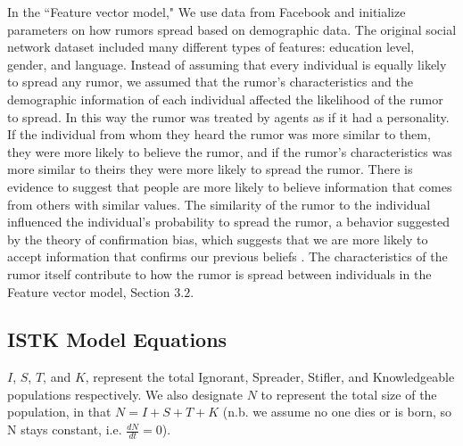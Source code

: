  In the ``Feature vector model," We use data from Facebook and initialize parameters on how rumors spread based on demographic data. The original social network dataset included many different types of features: education level, gender, and language. Instead of assuming that every individual is equally likely to spread any rumor, we assumed that the rumor's characteristics and the demographic information of each individual affected the likelihood of the rumor to spread. In this way the rumor was treated by agents as if it had a personality. If the individual from whom they heard the rumor was more similar to them, they were more likely to believe the rumor, and if the rumor's characteristics was more similar to theirs they were more likely to spread the rumor. There is evidence to suggest that people are more likely to believe information that comes from others with similar values\cite{gillespie-2004}. The similarity of the rumor to the individual influenced the individual's probability to spread the rumor, a behavior suggested by the theory of confirmation bias, which suggests that we are more likely to accept information that confirms our previous beliefs \cite{wason-1960}. The characteristics of the rumor itself contribute to how the rumor is spread between individuals in the Feature vector model, Section $3.2$.

\subsection{ISTK Model Equations}
\label{subsec:istkeqns}


\noindent $ I $, $ S $, $ T $, and $ K $, represent the total Ignorant, Spreader, Stifler, and Knowledgeable populations respectively. We also designate $ N $ to represent the total size of the population, in that $ N = I + S + T + K $ (n.b. we assume no one dies or is born, so N stays constant, i.e. $\frac{dN}{dt} = 0$).

